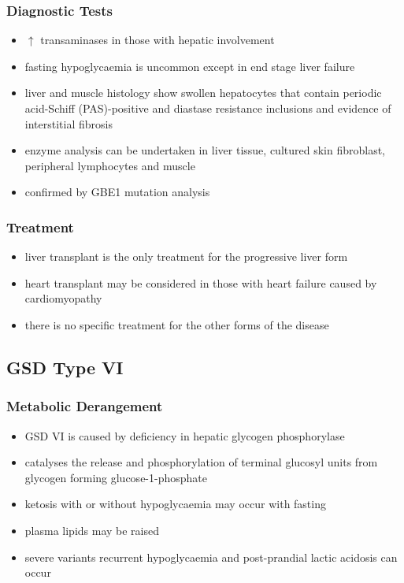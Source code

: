 \documentclass{scrartcl}
\begin{document}
\subsubsection{Diagnostic Tests}
\label{sec:org0828e35}

\begin{itemize}
\item \(\uparrow\) transaminases in those with hepatic involvement
\item fasting hypoglycaemia is uncommon except in end stage liver failure
\item liver and muscle histology show swollen hepatocytes that contain
periodic acid-Schiff (PAS)-positive and diastase resistance
inclusions and evidence of interstitial fibrosis
\item enzyme analysis can be undertaken in liver tissue, cultured skin
fibroblast, peripheral lymphocytes and muscle
\item confirmed by GBE1 mutation analysis
\end{itemize}

\subsubsection{Treatment}
\label{sec:org0c9a7f3}
\begin{itemize}
\item liver transplant is the only treatment for the progressive liver form
\item heart transplant may be considered in those with heart failure caused by cardiomyopathy
\item there is no specific treatment for the other forms of the disease
\end{itemize}
\subsection{GSD Type VI}
\label{sec:org85b6819}
\subsubsection{Metabolic Derangement}
\label{sec:org8001e82}
\begin{itemize}
\item GSD VI is caused by deficiency in hepatic glycogen phosphorylase
\item catalyses the release and phosphorylation of terminal glucosyl units
from glycogen forming glucose-1-phosphate
\item ketosis with or without hypoglycaemia may occur with fasting
\item plasma lipids may be raised
\item severe variants recurrent hypoglycaemia and post-prandial lactic
acidosis can occur
\end{itemize}
\end{document}
